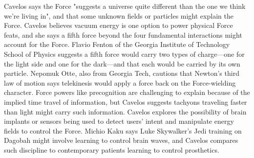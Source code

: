\documentclass{ruthesis}
\begin{document}
Cavelos says the Force "suggests a universe quite different than the one we think we're living in", and that some unknown fields or particles might explain the Force. Cavelos believes vacuum energy is one option to power physical Force feats, and she says a fifth force beyond the four fundamental interactions might account for the Force. Flavio Fenton of the Georgia Institute of Technology School of Physics suggests a fifth force would carry two types of charge—one for the light side and one for the dark—and that each would be carried by its own particle. Nepomuk Otte, also from Georgia Tech, cautions that Newton's third law of motion says telekinesis would apply a force back on the Force-wielding character. Force powers like precognition are challenging to explain because of the implied time travel of information, but Cavelos suggests tachyons traveling faster than light might carry such information. Cavelos explores the possibility of brain implants or sensors being used to detect users' intent and manipulate energy fields to control the Force. Michio Kaku says Luke Skywalker's Jedi training on Dagobah might involve learning to control brain waves, and Cavelos compares such discipline to contemporary patients learning to control prosthetics.

\clearpage
\nocite{*}


\end{document}
